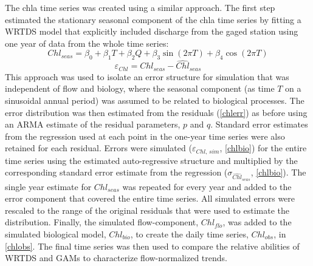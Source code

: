 \documentclass[letterpaper,12pt,oneside]{article}\usepackage[]{graphicx}\usepackage[]{color}
\begin{document}
The \ac{chla} time series was created using a similar approach.  The first step estimated the stationary seasonal component of the \ac{chla} time series by fitting a \ac{WRTDS} model \citep{Hirsch10} that explicitly included discharge from the gaged station using one year of data from the whole time series:
\begin{equation}\label{chlseas}
Chl_{seas} = \beta_0 + \beta_1 T + \beta_2 Q + \beta_3 \sin\left(2\pi T\right) + \beta_4 \cos\left(2\pi T\right)
\end{equation}
\begin{equation} \label{chlerr}
\varepsilon_{Chl} = Chl_{seas} - \widehat{Chl}_{seas}
\end{equation}
This approach was used to isolate an error structure for simulation that was independent of flow and biology, where the seasonal component (as time $T$ on a sinusoidal annual period) was assumed to be related to biological processes.  The error distribution was then estimated from the residuals (\cref{chlerr}) as before using an \ac{ARMA} estimate of the residual parameters, $p$ and $q$.  Standard error estimates from the regression used at each point in the one-year time series were also retained for each residual.  Errors were simulated ($\varepsilon_{Chl,\,sim}$, \cref{chlbio}) for the entire time series using the estimated auto-regressive structure and multiplied by the corresponding standard error estimate from the regression ($\sigma_{\widehat{Chl}_{seas}}$, \cref{chlbio}).  The single year estimate for $Chl_{seas}$ was repeated for every year and added to the error component that covered the entire time series.  All simulated errors were rescaled to the range of the original residuals that were used to estimate the distribution.  Finally, the simulated flow-component, $Chl_{flo}$, was added to the simulated biological model, $Chl_{bio}$, to create the daily time series, $Chl_{obs}$, in \cref{chlobs}.  The final time series was then used to compare the relative abilities of \ac{WRTDS} and \acp{GAM} to characterize flow-normalized trends.  

\end{document}
